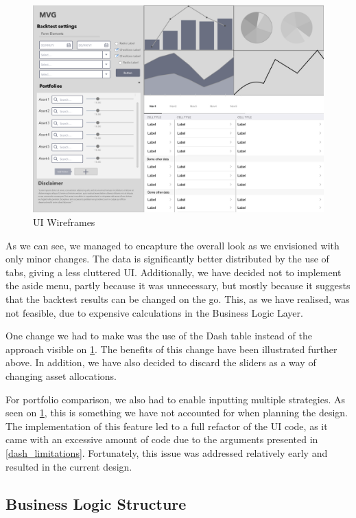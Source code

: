 \documentclass[main.tex]{subfiles}
\begin{document}
\begin{figure}[H]
   \centering
   \includegraphics[width=\textwidth]{04Design/04Pictures/wireframe.png}
   \caption{UI Wireframes}
   \label{wireframe}
\end{figure}

As we can see, we managed to encapture the overall look as we envisioned with only minor changes. The data is significantly better distributed by the use of tabs, giving a less cluttered UI. Additionally, we have decided not to implement the aside menu, partly because it was unnecessary, but mostly because it suggests that the backtest results can be changed on the go. This, as we have realised, was not feasible, due to expensive calculations in the Business Logic Layer.

One change we had to make was the use of the Dash table instead of the approach visible on \figurename{\ref{wireframe}}. The benefits of this change have been illustrated further above. In addition, we have also decided to discard the sliders as a way of changing asset allocations.

For portfolio comparison, we also had to enable inputting multiple strategies. As seen on \figurename{\ref{wireframe}}, this is something we have not accounted for when planning the design. The implementation of this feature led to a full refactor of the UI code, as it came with an excessive amount of code due to the arguments presented in \ref{dash_limitations}. Fortunately, this issue was addressed relatively early and resulted in the current design. 

\subsection{Business Logic Structure}
\label{BL Structure}
\end{document}
